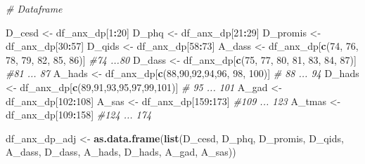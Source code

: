\documentclass[
]{article}
\newenvironment{Shaded}{\begin{snugshade}}{\end{snugshade}}
\newcommand{\CommentTok}[1]{\textcolor[rgb]{0.56,0.35,0.01}{\textit{#1}}}
\newcommand{\DecValTok}[1]{\textcolor[rgb]{0.00,0.00,0.81}{#1}}
\newcommand{\FunctionTok}[1]{\textcolor[rgb]{0.13,0.29,0.53}{\textbf{#1}}}
\newcommand{\NormalTok}[1]{#1}
\newcommand{\OtherTok}[1]{\textcolor[rgb]{0.56,0.35,0.01}{#1}}
\newcommand{\SpecialCharTok}[1]{\textcolor[rgb]{0.81,0.36,0.00}{\textbf{#1}}}
\begin{document}
\begin{Shaded}
\begin{Highlighting}[]
\CommentTok{\# Dataframe}

\NormalTok{D\_cesd }\OtherTok{\textless{}{-}}\NormalTok{ df\_anx\_dp[}\DecValTok{1}\SpecialCharTok{:}\DecValTok{20}\NormalTok{]}
\NormalTok{D\_phq }\OtherTok{\textless{}{-}}\NormalTok{ df\_anx\_dp[}\DecValTok{21}\SpecialCharTok{:}\DecValTok{29}\NormalTok{]}
\NormalTok{D\_promis }\OtherTok{\textless{}{-}}\NormalTok{ df\_anx\_dp[}\DecValTok{30}\SpecialCharTok{:}\DecValTok{57}\NormalTok{]}
\NormalTok{D\_qids }\OtherTok{\textless{}{-}}\NormalTok{ df\_anx\_dp[}\DecValTok{58}\SpecialCharTok{:}\DecValTok{73}\NormalTok{]}
\NormalTok{A\_dass }\OtherTok{\textless{}{-}}\NormalTok{ df\_anx\_dp[}\FunctionTok{c}\NormalTok{(}\DecValTok{74}\NormalTok{, }\DecValTok{76}\NormalTok{, }\DecValTok{78}\NormalTok{, }\DecValTok{79}\NormalTok{, }\DecValTok{82}\NormalTok{, }\DecValTok{85}\NormalTok{, }\DecValTok{86}\NormalTok{)] }\CommentTok{\#74 ...80}
\NormalTok{D\_dass }\OtherTok{\textless{}{-}}\NormalTok{ df\_anx\_dp[}\FunctionTok{c}\NormalTok{(}\DecValTok{75}\NormalTok{, }\DecValTok{77}\NormalTok{, }\DecValTok{80}\NormalTok{, }\DecValTok{81}\NormalTok{, }\DecValTok{83}\NormalTok{, }\DecValTok{84}\NormalTok{, }\DecValTok{87}\NormalTok{)] }\CommentTok{\#81 ... 87 }
\NormalTok{A\_hads }\OtherTok{\textless{}{-}}\NormalTok{ df\_anx\_dp[}\FunctionTok{c}\NormalTok{(}\DecValTok{88}\NormalTok{,}\DecValTok{90}\NormalTok{,}\DecValTok{92}\NormalTok{,}\DecValTok{94}\NormalTok{,}\DecValTok{96}\NormalTok{, }\DecValTok{98}\NormalTok{, }\DecValTok{100}\NormalTok{)] }\CommentTok{\# 88 ... 94}
\NormalTok{D\_hads }\OtherTok{\textless{}{-}}\NormalTok{ df\_anx\_dp[}\FunctionTok{c}\NormalTok{(}\DecValTok{89}\NormalTok{,}\DecValTok{91}\NormalTok{,}\DecValTok{93}\NormalTok{,}\DecValTok{95}\NormalTok{,}\DecValTok{97}\NormalTok{,}\DecValTok{99}\NormalTok{,}\DecValTok{101}\NormalTok{)] }\CommentTok{\# 95 ... 101}
\NormalTok{A\_gad }\OtherTok{\textless{}{-}}\NormalTok{ df\_anx\_dp[}\DecValTok{102}\SpecialCharTok{:}\DecValTok{108}\NormalTok{]}
\NormalTok{A\_sas }\OtherTok{\textless{}{-}}\NormalTok{ df\_anx\_dp[}\DecValTok{159}\SpecialCharTok{:}\DecValTok{173}\NormalTok{] }\CommentTok{\#109 ... 123}
\NormalTok{A\_tmas }\OtherTok{\textless{}{-}}\NormalTok{ df\_anx\_dp[}\DecValTok{109}\SpecialCharTok{:}\DecValTok{158}\NormalTok{] }\CommentTok{\#124 ... 174}


\NormalTok{df\_anx\_dp\_adj }\OtherTok{\textless{}{-}} \FunctionTok{as.data.frame}\NormalTok{(}\FunctionTok{list}\NormalTok{(D\_cesd, D\_phq, D\_promis, D\_qids, A\_dass, D\_dass, A\_hads, D\_hads, A\_gad, A\_sas))}




\end{Highlighting}
\end{Shaded}
\end{document}
